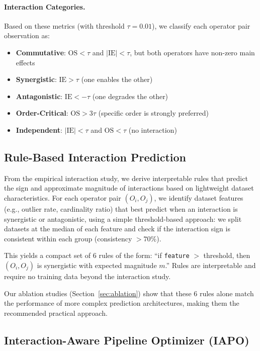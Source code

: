 \documentclass[preprint]{article}
\newcommand{\ie}{\text{IE}}
\newcommand{\os}{\text{OS}}
\begin{document}
\paragraph{Interaction Categories.} Based on these metrics (with threshold $\tau = 0.01$), we classify each operator pair observation as:
\begin{itemize}[nosep]
  \item \textbf{Commutative}: $\os < \tau$ and $|\ie| < \tau$, but both operators have non-zero main effects
  \item \textbf{Synergistic}: $\ie > \tau$ (one enables the other)
  \item \textbf{Antagonistic}: $\ie < -\tau$ (one degrades the other)
  \item \textbf{Order-Critical}: $\os > 3\tau$ (specific order is strongly preferred)
  \item \textbf{Independent}: $|\ie| < \tau$ and $\os < \tau$ (no interaction)
\end{itemize}

\subsection{Rule-Based Interaction Prediction}
\label{sec:rules}

From the empirical interaction study, we derive interpretable rules that predict the sign and approximate magnitude of interactions based on lightweight dataset characteristics. For each operator pair $(O_i, O_j)$, we identify dataset features (e.g., outlier rate, cardinality ratio) that best predict when an interaction is synergistic or antagonistic, using a simple threshold-based approach: we split datasets at the median of each feature and check if the interaction sign is consistent within each group (consistency $> 70\%$).

This yields a compact set of 6 rules of the form: ``if \texttt{feature} $>$ threshold, then $(O_i, O_j)$ is synergistic with expected magnitude $m$.'' Rules are interpretable and require no training data beyond the interaction study.

Our ablation studies (Section~\ref{sec:ablation}) show that these 6 rules alone match the performance of more complex prediction architectures, making them the recommended practical approach.

\subsection{Interaction-Aware Pipeline Optimizer (IAPO)}
\end{document}
